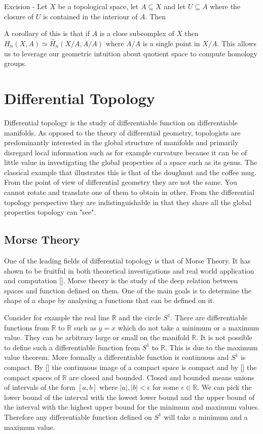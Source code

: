 \begin{thm} Excision - Let $X$ be a topological space, let $A \subseteq X$ and let $U \subseteq A$ where the closure of $U$ is contained in the interiour of $A$. Then   \end{thm}


A corollary of this is that if $A$ is a close subcomplex of $X$ then $H_n(X, A) \simeq \overset{\sim}{H}_n(X/A, A/A)$ where $A/A$ is a single point in $X/A$. This allows us to leverage our geometric intuition about quotient space to compute homology groups.



\section{Differential Topology}

Differential topology is the study of differentiable function on differentiable manifolds. As opposed to the theory of differential geometry, topologists are predominantly interested in the global structure of manifolds and primarily disregard local information such as for example curvature because it can be of little value in investigating the global properties of a space such as its genus. The classical example that illustrates this is that of the doughnut and the coffee mug. From the point of view of differential geometry they are not the same. You cannot rotate and translate one of them to obtain in other. From the differential topology perspective they are indistinguishable in that they share all the global properties topology can "see".   

\subsection{Morse Theory}

One of the leading fields of differential topology is that of Morse Theory. It has shown to be fruitful in both theoretical investigations and real world application and computation []. Morse theory is the study of the deep relation between spaces and function defined on them. One of the main goals is to determine the shape of a shape by analysing a functions that can be defined on it. 

Consider for example the real line $\mathbb{R}$ and the circle $S^1$. There are differentiable functions from $\mathbb{R}$ to $\mathbb{R}$ such as $y = x$ which do not take a minimum or a maximum value. They can be arbitrary large or small on the manifold $\mathbb{R}$. It is not possible to define such a differentiable function from $S^1$ to $\mathbb{R}$. This is due to the maximum value theorem. More formally a differentiable function is continuous and $S^1$ is compact. By [] the continuous image of a compact space is compact and by [] the compact spaces of $\mathbb{R}$ are closed and bounded. Closed and bounded means unions of intervals of the form $[a, b]$ where $|a|, |b| < \epsilon$ for some $\epsilon \in \mathbb{R}$. We can pick the lower bound of the interval with the lowest lower bound and the upper bound of the interval with the highest upper bound for the minimum and maximum values. Therefore any differentiable function defined on $S^1$ will take a minimum and a maximum value.

